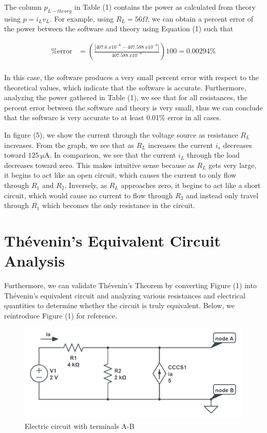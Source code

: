 \documentclass[12pt]{article}
\begin{document}
The column $p_{L-theory}$ in Table (1) contains the power as calculated from theory using $p=i_Lv_L$. For example, using $R_L = 56 \Omega$, we can obtain a percent error of the power between the software and theory using Equation (1) such that

\begin{equation*}
    \begin{split}
        \text{\% error} &= \left( \frac{|\SI{407.6}{x10^{-6}} - \SI{407.588}{x10^{-6}}|}{\SI{407.588}{x10^{-6}}} \right) 100 = 0.00294 \% \\
    \end{split}
\end{equation*}

In this case, the software produces a very small percent error with respect to the theoretical values, which indicate that the software is accurate. Furthermore, analyzing the power gathered in Table (1), we see that for all resistances, the percent error between the software and theory is very small, thus we can conclude that the software is very accurate to at least 0.01\% error in all cases.

In figure (5), we show the current through the voltage source as resistance $R_L$ increases. From the graph, we see that as $R_L$ increases the current $i_s$ decreases toward $\SI{125}{\micro\ampere}$. In comparison, we see that the current $i_L$ through the load decreases toward zero. This makes intuitive sense because as $R_L$ gets very large, it begins to act like an open circuit, which causes the current to only flow through $R_1$ and $R_2$. Inversely, as $R_L$ approaches zero, it begins to act like a short circuit, which would cause no current to flow through $R_2$ and instead only travel through $R_1$ which becomes the only resistance in the circuit.

\pagebreak

\section{Thévenin's Equivalent Circuit Analysis}
Furthermore, we can validate Thévenin's Theorem by converting Figure (1) into Thévenin's equivalent circuit and analyzing various resistances and electrical quantities to determine whether the circuit is truly equivalent. Below, we reintroduce Figure (1) for reference.

\begin{figure}[H]
    \begin{center}
        \includegraphics[scale=0.7]{circuit-1-2.png}
        \caption { Electric circuit with terminals A-B}
    \end{center}
\end{figure}
\end{document}
